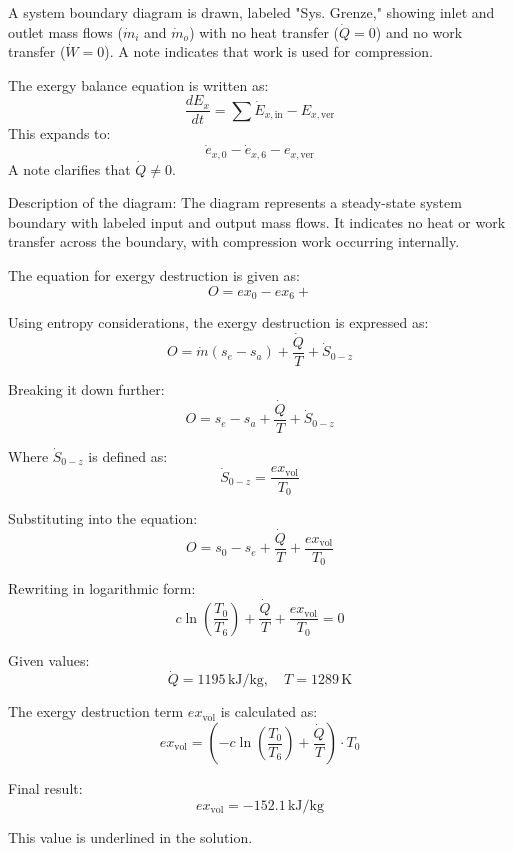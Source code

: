 A system boundary diagram is drawn, labeled "Sys. Grenze," showing inlet and outlet mass flows (\( \dot{m}_i \) and \( \dot{m}_o \)) with no heat transfer (\( \dot{Q} = 0 \)) and no work transfer (\( \dot{W} = 0 \)). A note indicates that work is used for compression.  

The exergy balance equation is written as:  
\[
\frac{dE_x}{dt} = \sum \dot{E}_{x,\text{in}} - E_{x,\text{ver}}
\]  
This expands to:  
\[
\dot{e}_{x,0} - \dot{e}_{x,6} - e_{x,\text{ver}}
\]  
A note clarifies that \( \dot{Q} \neq 0 \).  

Description of the diagram:  
The diagram represents a steady-state system boundary with labeled input and output mass flows. It indicates no heat or work transfer across the boundary, with compression work occurring internally.

The equation for exergy destruction is given as:  
\[
O = ex_{0} - ex_{6} + 
\]  

Using entropy considerations, the exergy destruction is expressed as:  
\[
O = \dot{m} (s_e - s_a) + \frac{\dot{Q}}{T} + \dot{S}_{0-z}
\]  

Breaking it down further:  
\[
O = s_e - s_a + \frac{\dot{Q}}{T} + \dot{S}_{0-z}
\]  

Where \( \dot{S}_{0-z} \) is defined as:  
\[
\dot{S}_{0-z} = \frac{ex_{\text{vol}}}{T_0}
\]  

Substituting into the equation:  
\[
O = s_0 - s_e + \frac{\dot{Q}}{T} + \frac{ex_{\text{vol}}}{T_0}
\]  

Rewriting in logarithmic form:  
\[
c \ln \left( \frac{T_0}{T_6} \right) + \frac{\dot{Q}}{T} + \frac{ex_{\text{vol}}}{T_0} = 0
\]  

Given values:  
\[
\dot{Q} = 1195 \, \text{kJ/kg}, \quad T = 1289 \, \text{K}
\]  

The exergy destruction term \( ex_{\text{vol}} \) is calculated as:  
\[
ex_{\text{vol}} = \left( -c \ln \left( \frac{T_0}{T_6} \right) + \frac{\dot{Q}}{T} \right) \cdot T_0
\]  

Final result:  
\[
ex_{\text{vol}} = -152.1 \, \text{kJ/kg}
\]  

This value is underlined in the solution.